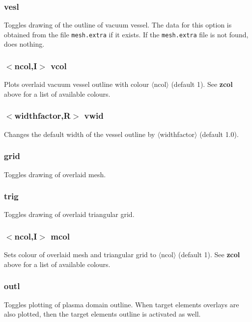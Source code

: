\documentclass[a4paper,10pt]{report}
\begin{document}
\subsubsection{vesl}\label{sec:vesl}
Toggles drawing of the outline of vacuum vessel.
The data for this option is obtained from the file {\tt mesh.extra} if it exists.
If the {\tt mesh.extra} file is not found, does nothing.

\subsubsection{$<$ncol,{\bf I}$>$ vcol}\label{sec:vcol}
Plots overlaid vacuum vessel outline with colour $\langle$ncol$\rangle$ (default 1).
See {\bf zcol} above for a list of available colours.

\subsubsection{$<$widthfactor,{\bf R}$>$ vwid}\label{sec:vwid}
Changes the default width of the vessel outline by $\langle$widthfactor$\rangle$ (default 1.0).

\subsubsection{grid}\label{sec:grid}
Toggles drawing of overlaid mesh.

\subsubsection{trig}\label{sec:trig}
Toggles drawing of overlaid triangular grid.

\subsubsection{$<$ncol,{\bf I}$>$ mcol}\label{sec:mcol}
Sets colour of overlaid mesh and triangular grid to $\langle$ncol$\rangle$ (default 1).
See {\bf zcol} above for a list of available colours.

\subsubsection{outl}\label{sec:outl}
Toggles plotting of plasma domain outline.
When target elements overlays are also plotted, then the target elements outline is activated as well.
\end{document}
